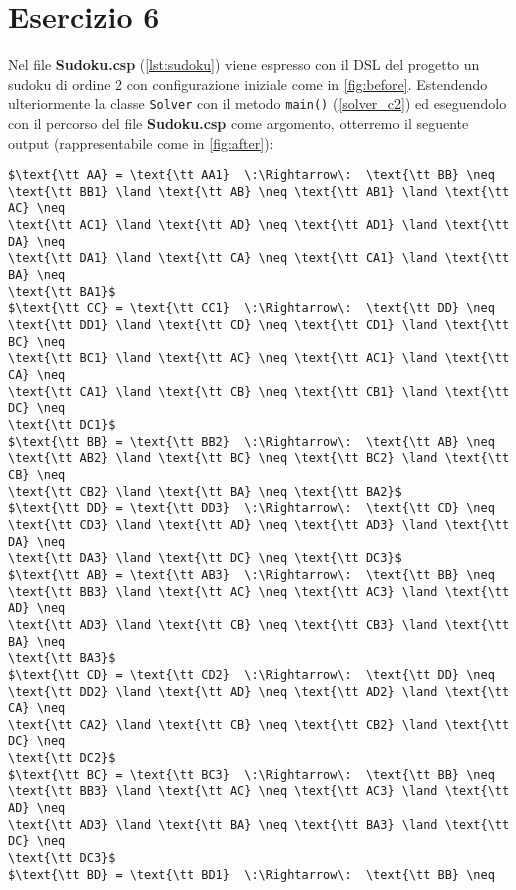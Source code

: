 \section*{Esercizio 6}

Nel file {\bf Sudoku.csp} (\autoref{lst:sudoku}) viene espresso con il DSL del
progetto un sudoku di ordine 2 con configurazione iniziale come in
\autoref{fig:before}. Estendendo ulteriormente la classe {\tt Solver} con il
metodo {\tt main()} (\autoref{solver_c2}) ed eseguendolo con il percorso del
file {\bf Sudoku.csp} come argomento, otterremo il seguente output
(rappresentabile come in \autoref{fig:after}):
%
\begin{lstlisting}[mathescape=true, numbers=none, frame=none]
$\text{\tt AA} = \text{\tt AA1}  \:\Rightarrow\:  \text{\tt BB} \neq
\text{\tt BB1} \land \text{\tt AB} \neq \text{\tt AB1} \land \text{\tt AC} \neq
\text{\tt AC1} \land \text{\tt AD} \neq \text{\tt AD1} \land \text{\tt DA} \neq
\text{\tt DA1} \land \text{\tt CA} \neq \text{\tt CA1} \land \text{\tt BA} \neq
\text{\tt BA1}$
$\text{\tt CC} = \text{\tt CC1}  \:\Rightarrow\:  \text{\tt DD} \neq
\text{\tt DD1} \land \text{\tt CD} \neq \text{\tt CD1} \land \text{\tt BC} \neq
\text{\tt BC1} \land \text{\tt AC} \neq \text{\tt AC1} \land \text{\tt CA} \neq
\text{\tt CA1} \land \text{\tt CB} \neq \text{\tt CB1} \land \text{\tt DC} \neq
\text{\tt DC1}$
$\text{\tt BB} = \text{\tt BB2}  \:\Rightarrow\:  \text{\tt AB} \neq
\text{\tt AB2} \land \text{\tt BC} \neq \text{\tt BC2} \land \text{\tt CB} \neq
\text{\tt CB2} \land \text{\tt BA} \neq \text{\tt BA2}$
$\text{\tt DD} = \text{\tt DD3}  \:\Rightarrow\:  \text{\tt CD} \neq
\text{\tt CD3} \land \text{\tt AD} \neq \text{\tt AD3} \land \text{\tt DA} \neq
\text{\tt DA3} \land \text{\tt DC} \neq \text{\tt DC3}$
$\text{\tt AB} = \text{\tt AB3}  \:\Rightarrow\:  \text{\tt BB} \neq
\text{\tt BB3} \land \text{\tt AC} \neq \text{\tt AC3} \land \text{\tt AD} \neq
\text{\tt AD3} \land \text{\tt CB} \neq \text{\tt CB3} \land \text{\tt BA} \neq
\text{\tt BA3}$
$\text{\tt CD} = \text{\tt CD2}  \:\Rightarrow\:  \text{\tt DD} \neq
\text{\tt DD2} \land \text{\tt AD} \neq \text{\tt AD2} \land \text{\tt CA} \neq
\text{\tt CA2} \land \text{\tt CB} \neq \text{\tt CB2} \land \text{\tt DC} \neq
\text{\tt DC2}$
$\text{\tt BC} = \text{\tt BC3}  \:\Rightarrow\:  \text{\tt BB} \neq
\text{\tt BB3} \land \text{\tt AC} \neq \text{\tt AC3} \land \text{\tt AD} \neq
\text{\tt AD3} \land \text{\tt BA} \neq \text{\tt BA3} \land \text{\tt DC} \neq
\text{\tt DC3}$
$\text{\tt BD} = \text{\tt BD1}  \:\Rightarrow\:  \text{\tt BB} \neq

\end{lstlisting}
